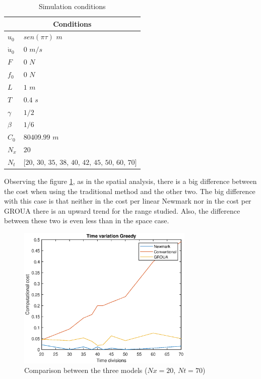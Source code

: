 \documentclass{ws-m3as}
\begin{document}
\begin{table}[htb]
\centering
\caption{Simulation conditions}
\label{tabla:condicionesTime}
\begin{tabular}{|l|l|}
\hline
\multicolumn{2}{|c|}{Conditions} \\ \hline
$u_0$ & $sen(\pi \tau)$ $m$ \\
$\dot{u}_0$ & $0$ $m/s$\\
$F$ & $0$ $N$\\
$f_0$ & $0$ $N$\\
$L$ & $1$ $m$\\
$T$ & $0.4$ $s$\\
$\gamma$ & $1/2$\\
$\beta$ & $1/6$ \\
$C_0$ & $80409.99$ $m$ \\
$N_x$ & $20$  \\
$N_t$ & [$20$, $30$, $35$, $38$, $40$, $42$, $45$, $50$, $60$, $70$]  \\
\hline
\end{tabular}
\end{table}

Observing the figure \ref{CompCost3Time}, as in the spatial analysis, there is a big difference between the cost when using the traditional method and the other two. The big difference with this case is that neither in the cost per linear Newmark nor in the cost per GROUA there is an upward trend for the range studied. Also, the difference between these two is even less than in the space case.


\begin{figure}
\centering
\includegraphics[width=0.75\textwidth]{CompCost3Time.eps}
\caption{Comparison between the three models ($Nx=20$, $Nt=70$)} 
\label{CompCost3Time}
\end{figure}
\end{document}
